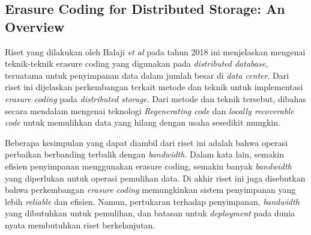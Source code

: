 \subsection{Erasure Coding for Distributed Storage: An Overview}

Riset yang dilakukan oleh Balaji \textit{et al} pada tahun 2018 ini menjelaskan mengenai teknik-teknik erasure coding yang digunakan pada \textit{distributed database}, teruatama untuk penyimpanan data dalam jumlah besar di \textit{data center}. Dari riset ini dijelaskan perkembangan terkait metode dan teknik untuk implementasi \textit{erasure coding} pada \textit{distributed storage}. Dari metode dan teknik tersebut, dibahas secara mendalam mengenai teknologi \textit{Regenerating code} dan \textit{locally recoverable code} untuk memulihkan data yang hilang dengan usaha sesedikit mungkin.

Beberapa kesimpulan yang dapat diambil dari riset ini adalah bahwa operasi perbaikan berbanding terbalik dengan \textit{bandwidth}. Dalam kata lain, semakin efisien penyimpanan menggunakan erasure coding, semakin banyak \textit{bandwidth} yang diperlukan untuk operasi pemulihan data. Di akhir riset ini juga disebutkan bahwa perkembangan \textit{erasure coding} memungkinkan sistem penyimpanan yang lebih \textit{reliable} dan efisien. Namun, pertukaran terhadap penyimpanan, \textit{bandwidth} yang dibutuhkan untuk pemulihan, dan batasan untuk \textit{deployment} pada dunia nyata membutuhkan riset berkelanjutan. 
